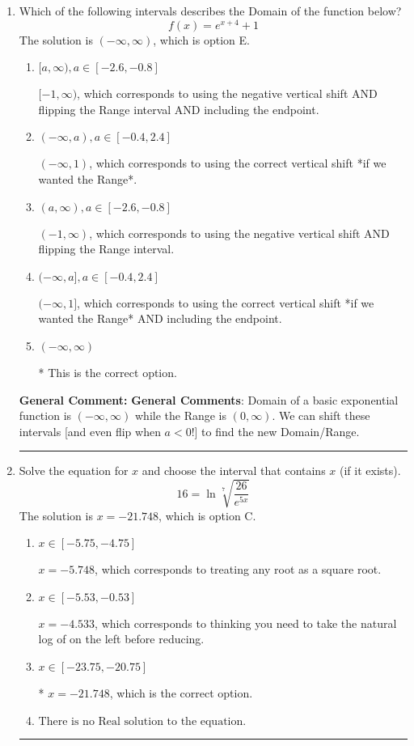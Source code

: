 \documentclass{extbook}[14pt]
\newcommand{\litem}[1]{\item #1

\rule{\textwidth}{0.4pt}}
\begin{document}
\begin{enumerate}\litem{
Which of the following intervals describes the Domain of the function below?
\[ f(x) = e^{x+4}+1 \]The solution is \( (-\infty, \infty) \), which is option E.\begin{enumerate}[label=\Alph*.]
\item \( [a, \infty), a \in [-2.6, -0.8] \)

$[-1, \infty)$, which corresponds to using the negative vertical shift AND flipping the Range interval AND including the endpoint.
\item \( (-\infty, a), a \in [-0.4, 2.4] \)

$(-\infty, 1)$, which corresponds to using the correct vertical shift *if we wanted the Range*.
\item \( (a, \infty), a \in [-2.6, -0.8] \)

$(-1, \infty)$, which corresponds to using the negative vertical shift AND flipping the Range interval.
\item \( (-\infty, a], a \in [-0.4, 2.4] \)

$(-\infty, 1]$, which corresponds to using the correct vertical shift *if we wanted the Range* AND including the endpoint.
\item \( (-\infty, \infty) \)

* This is the correct option.
\end{enumerate}

\textbf{General Comment:} \textbf{General Comments}: Domain of a basic exponential function is $(-\infty, \infty)$ while the Range is $(0, \infty)$. We can shift these intervals [and even flip when $a<0$!] to find the new Domain/Range.
}
\litem{
 Solve the equation for $x$ and choose the interval that contains $x$ (if it exists).
\[  16 = \ln{\sqrt[7]{\frac{26}{e^{5x}}}} \]The solution is \( x = -21.748 \), which is option C.\begin{enumerate}[label=\Alph*.]
\item \( x \in [-5.75, -4.75] \)

$x = -5.748$, which corresponds to treating any root as a square root.
\item \( x \in [-5.53, -0.53] \)

$x = -4.533$, which corresponds to thinking you need to take the natural log of on the left before reducing.
\item \( x \in [-23.75, -20.75] \)

* $x = -21.748$, which is the correct option.
\item \( \text{There is no Real solution to the equation.} \)


\end{enumerate}}
\end{enumerate}
\end{document}
